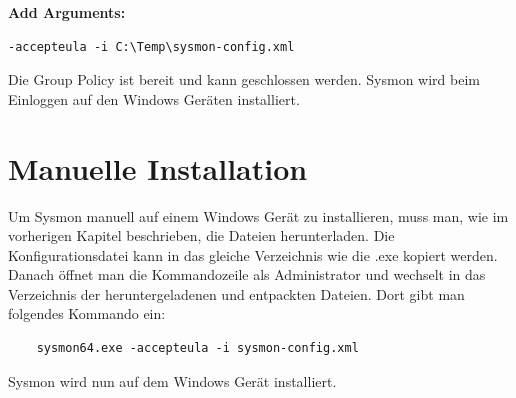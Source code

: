 \textbf{Add Arguments:}
\begin{lstlisting}
-accepteula -i C:\Temp\sysmon-config.xml
\end{lstlisting}

Die Group Policy ist bereit und kann geschlossen werden.
Sysmon wird beim Einloggen auf den Windows Geräten installiert.

\section{Manuelle Installation}
Um Sysmon manuell auf einem Windows Gerät zu installieren, muss man, wie im vorherigen Kapitel beschrieben, die Dateien herunterladen.
Die Konfigurationsdatei kann in das gleiche Verzeichnis wie die .exe kopiert werden.
Danach öffnet man die Kommandozeile als Administrator und wechselt in das Verzeichnis der heruntergeladenen und entpackten Dateien.
Dort gibt man folgendes Kommando ein:
\begin{lstlisting}
    sysmon64.exe -accepteula -i sysmon-config.xml
\end{lstlisting}

Sysmon wird nun auf dem Windows Gerät installiert.
